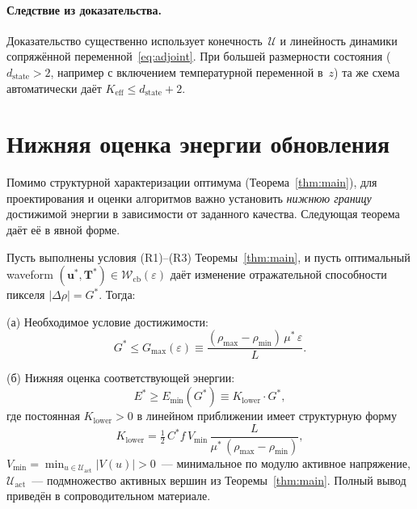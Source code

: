 \paragraph{Следствие из доказательства.} Доказательство существенно использует
конечность~$\mathcal{U}$ и линейность динамики сопряжённой
переменной~\eqref{eq:adjoint}. При большей размерности состояния
($d_{\mathrm{state}} > 2$, например с включением температурной переменной
в~$z$) та же схема автоматически даёт
$K_{\mathrm{eff}} \le d_{\mathrm{state}} + 2$.


\section{Нижняя оценка энергии обновления}\label{sec:lower-bound}

Помимо структурной характеризации оптимума (Теорема~\ref{thm:main}), для
проектирования и оценки алгоритмов важно установить \emph{нижнюю границу}
достижимой энергии в зависимости от заданного качества. Следующая теорема
даёт её в явной форме.

\begin{theorem}
\label{thm:lower-bound}
Пусть выполнены условия (R1)--(R3) Теоремы~\ref{thm:main}, и пусть
оптимальный waveform
$(\mathbf{u}^*, \mathbf{T}^*) \in \mathcal{W}_{\mathrm{cb}}(\varepsilon)$
даёт изменение отражательной способности пикселя
$|\Delta \rho| = G^*$. Тогда:

\textnormal{(а) Необходимое условие достижимости:}
\begin{equation}\label{eq:reachability}
    G^* \le G_{\max}(\varepsilon)
    \equiv \frac{(\rho_{\max} - \rho_{\min})\, \mu^* \, \varepsilon}{L}.
\end{equation}

\textnormal{(б) Нижняя оценка соответствующей энергии:}
\begin{equation}\label{eq:lower-bound}
    \boxed{\;E^* \ge E_{\min}(G^*) \equiv K_{\mathrm{lower}}\cdot G^*,\;}
\end{equation}
где постоянная $K_{\mathrm{lower}} > 0$ в линейном приближении имеет
структурную форму
$$
    K_{\mathrm{lower}}
    = \tfrac{1}{2}\, C^* f\, V_{\min}\,
    \frac{L}{\mu^*\,(\rho_{\max} - \rho_{\min})},
$$
$V_{\min} = \min_{u \in \mathcal{U}_{\mathrm{act}}} |V(u)| > 0$~--- минимальное
по модулю активное напряжение, $\mathcal{U}_{\mathrm{act}}$~--- подмножество
активных вершин из Теоремы~\ref{thm:main}. Полный вывод приведён в
сопроводительном материале.
\end{theorem}


